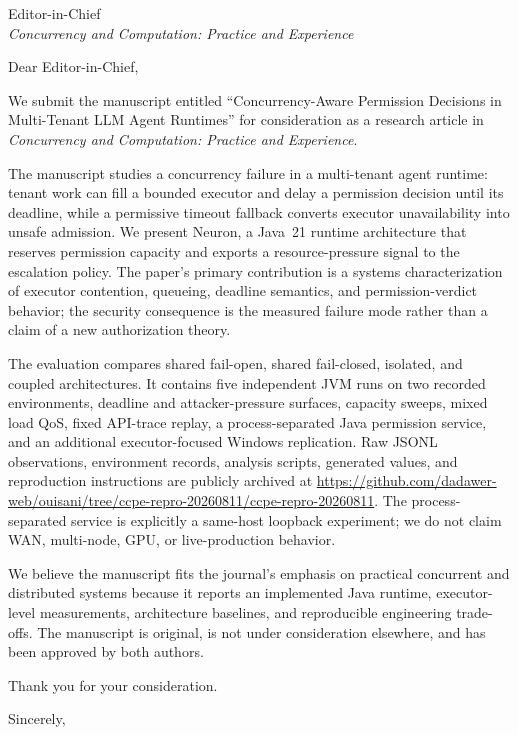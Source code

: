 \documentclass[11pt]{letter}
\date{11 August 2026}
\begin{document}
\begin{letter}{Editor-in-Chief\\\emph{Concurrency and Computation: Practice and Experience}}

\opening{Dear Editor-in-Chief,}

We submit the manuscript entitled ``Concurrency-Aware Permission Decisions in
Multi-Tenant LLM Agent Runtimes'' for consideration as a research article in
\emph{Concurrency and Computation: Practice and Experience}.

The manuscript studies a concurrency failure in a multi-tenant agent runtime:
tenant work can fill a bounded executor and delay a permission decision until
its deadline, while a permissive timeout fallback converts executor
unavailability into unsafe admission. We present Neuron, a Java~21 runtime
architecture that reserves permission capacity and exports a resource-pressure
signal to the escalation policy. The paper's primary contribution is a
systems characterization of executor contention, queueing, deadline semantics,
and permission-verdict behavior; the security consequence is the measured
failure mode rather than a claim of a new authorization theory.

The evaluation compares shared fail-open, shared fail-closed, isolated, and
coupled architectures. It contains five independent JVM runs on two recorded
environments, deadline and attacker-pressure surfaces, capacity sweeps, mixed
load QoS, fixed API-trace replay, a process-separated Java permission service,
and an additional executor-focused Windows replication. Raw JSONL observations,
environment records, analysis scripts, generated values, and reproduction
instructions are publicly archived at
\url{https://github.com/dadawer-web/ouisani/tree/ccpe-repro-20260811/ccpe-repro-20260811}.
The process-separated service is explicitly a same-host loopback experiment;
we do not claim WAN, multi-node, GPU, or live-production behavior.

We believe the manuscript fits the journal's emphasis on practical concurrent
and distributed systems because it reports an implemented Java runtime,
executor-level measurements, architecture baselines, and reproducible
engineering trade-offs. The manuscript is original, is not under consideration
elsewhere, and has been approved by both authors.

Thank you for your consideration.

\closing{Sincerely,}
\end{letter}
\end{document}
